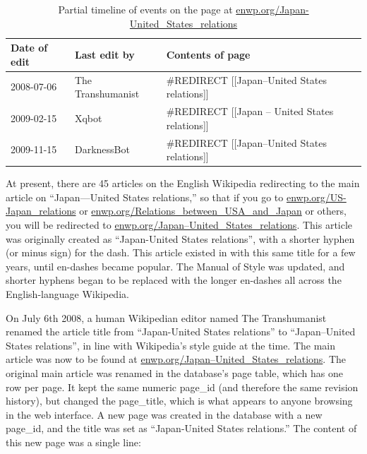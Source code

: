 \documentclass[format=acmsmall, review=false, screen=true]{acmart}%
\begin{document}
\begin{table}[h]
\centering
\caption{Partial timeline of events on the page at \url{enwp.org/Japan-United_States_relations}}
\label{Japantable}
\begin{tabular}{|l|l|l|}
\hline
\textbf{Date of edit} & \textbf{Last edit by} & \textbf{Contents of page}                              \\ \hline
2008-07-06            & The Transhumanist     & \#REDIRECT {[}{[}Japan--United States relations{]}{]}   \\ \hline
2009-02-15            & Xqbot                 & \#REDIRECT {[}{[}Japan -- United States relations{]}{]} \\ \hline
2009-11-15           & DarknessBot           & \#REDIRECT {[}{[}Japan--United States relations{]}{]}   \\ \hline
\end{tabular}
\end{table}


At present, there are 45 articles on the English Wikipedia redirecting to the main article on ``Japan---United States relations,'' so that if you go to \url{enwp.org/US-Japan\_relations} or \url{enwp.org/Relations\_between\_USA\_and\_Japan} or others, you will be redirected to \href{http://enwp.org/Japan–United\_States\_relations}{enwp.org/Japan–United\_States\_relations}. This article was originally created as ``Japan-United States relations'', with a shorter hyphen (or minus sign) for the dash. This article existed in with this same title for a few years, until en-dashes became popular. The Manual of Style was updated, and shorter hyphens began to be replaced with the longer en-dashes all across the English-language Wikipedia.  

On July 6th 2008, a human Wikipedian editor named The Transhumanist renamed the article title from ``Japan-United States relations'' to ``Japan--United States relations'', in line with Wikipedia's style guide at the time. The main article was now to be found at \href{http://enwp.org/Japan–United\_States\_relations}{enwp.org/Japan–United\_States\_relations}. The original main article was renamed in the database's page table, which has one row per page. It kept the same numeric page\_id (and therefore the same revision history), but changed the page\_title, which is what appears to anyone browsing in the web interface. A new page was created in the database with a new page\_id, and the title was set as ``Japan-United States relations.'' The content of this new page was a single line:  
\end{document}
